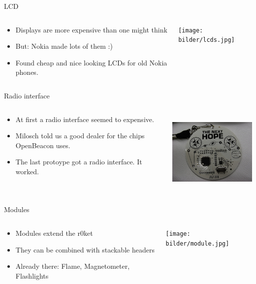 \documentclass{beamer}
\begin{document}
\begin{frame}{LCD}
  \begin{columns}
    \begin{column}{6cm}
        \begin{itemize}
		\item Displays are more expensive than one might think
		\item But: Nokia made lots of them :)
		\item Found cheap and nice looking LCDs for old Nokia phones.
	\end{itemize}
    \end{column}
    \begin{column}{6cm}
	\texttt{[image: bilder/lcds.jpg]}
    \end{column}
  \end{columns}
\end{frame}
\begin{frame}{Radio interface}
  \begin{columns}
    \begin{column}{6cm}
        \begin{itemize}
		\item At first a radio interface seemed to expensive.
		\item Milosch told us a good dealer for the chips OpenBeacon uses.
		\item The last protoype got a radio interface. It worked.
	\end{itemize}
    \end{column}
    \begin{column}{6cm}
        \includegraphics[height=4cm]{bilder/radio.jpg}
    \end{column}
  \end{columns}
\end{frame}
\begin{frame}{Modules}
  \begin{columns}
    \begin{column}{6cm}
        \begin{itemize}
		\item Modules extend the r0ket
		\item They can be combined with stackable headers
		\item Already there: Flame, Magnetometer, Flashlights
	\end{itemize}
    \end{column}
    \begin{column}{6cm}
        \texttt{[image: bilder/module.jpg]}
    \end{column}
  \end{columns}
\end{frame}
\end{document}
